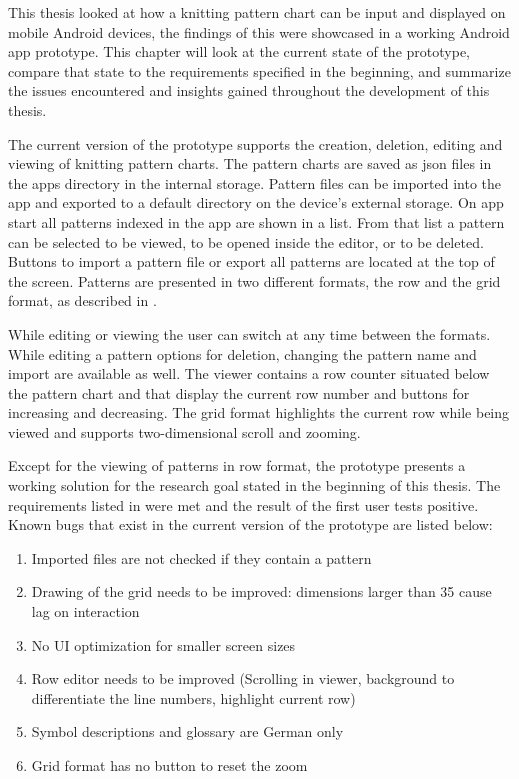 This thesis looked at how a knitting pattern chart can be input and displayed on mobile Android devices, the findings of this were showcased in a working Android app prototype. This chapter will look at the current state of the prototype, compare that state to the requirements specified in the beginning, and summarize the issues encountered and insights gained throughout the development of this thesis.

The current version of the prototype supports the creation, deletion, editing and viewing of knitting pattern charts. The pattern charts are saved as \gls{json} files in the apps directory in the internal storage. Pattern files can be imported into the app and exported to a default directory on the device's external storage. On app start all patterns indexed in the app are shown in a list. From that list a pattern can be selected to be viewed, to be opened inside the editor, or to be deleted. Buttons to import a pattern file or export all patterns are located at the top of the screen. Patterns are presented in two different formats, the row and the grid format, as described in .

While editing or viewing the user can switch at any time between the formats. While editing a pattern options for deletion, changing the pattern name and import are available as well. The viewer contains a row counter situated below the pattern chart and that display the current row number and buttons for increasing and decreasing. The grid format highlights the current row while being viewed and supports two-dimensional scroll and zooming.

Except for the viewing of patterns in row format, the prototype presents a working solution for the research goal stated in the beginning of this thesis. The requirements listed in  were met and the result of the first user tests positive. Known bugs that exist in the current version of the prototype are listed below:

\begin{enumerate}
\item Imported files are not checked if they contain a pattern
\item Drawing of the grid needs to be improved: dimensions larger than 35 cause lag on interaction
\item No \gls{UI} optimization for smaller screen sizes
\item Row editor needs to be improved (Scrolling in viewer, background to differentiate the line numbers, highlight current row)
\item Symbol descriptions and glossary are German only
\item Grid format has no button to reset the zoom
\end{enumerate}

